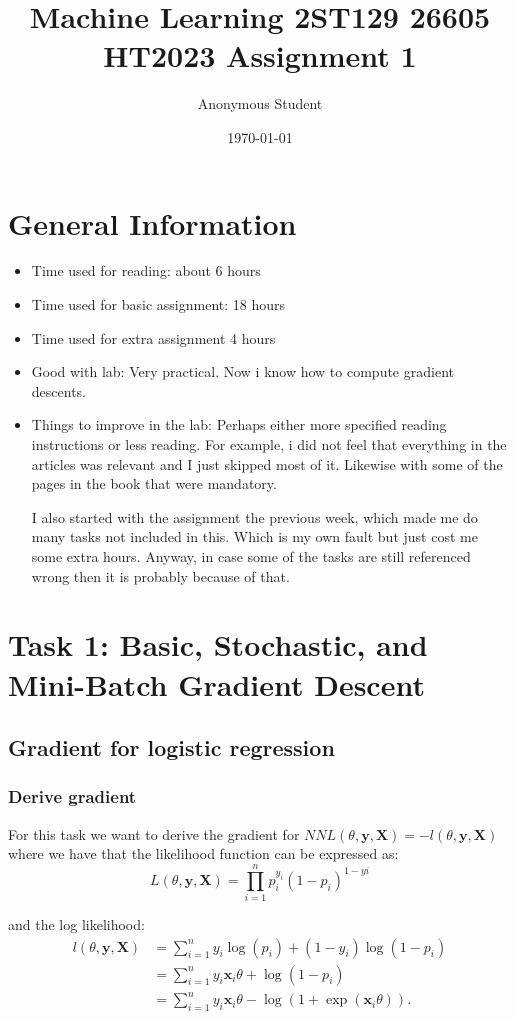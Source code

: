 \documentclass[11pt, a4paper, english]{article}\usepackage[]{graphicx}\usepackage[dvipsnames]{xcolor}
\title{Machine Learning 2ST129 26605 HT2023
 Assignment 1 }
\author{Anonymous Student}
\date{\today}
\begin{document}
\maketitle
\newpage
\tableofcontents
\newpage




\section{General Information}
\begin{itemize}
\item Time used for reading: about 6 hours
\item Time used for basic assignment: 18 hours
\item Time used for extra assignment 4 hours
\item Good with lab: Very practical. Now i know how to compute gradient descents.
\item Things to improve in the lab: Perhaps either more specified reading instructions or less reading. For example, i did not feel that everything in the articles was relevant and I just skipped most of it. Likewise with some of the pages in the book that were mandatory. 

I also started with the assignment the previous week, which made me do many tasks not included in this. Which is my own fault but just cost me some extra hours. Anyway, in case some of the tasks are still referenced wrong then it is probably because of that. 
\end{itemize}
\newpage




\section{Task 1: Basic, Stochastic, and Mini-Batch Gradient Descent}
\subsection{Gradient for logistic regression}
\subsubsection{Derive gradient}
For this task we want to derive the gradient for $NNL(\theta, \bm{y}, \bm{X}) = -l(\theta, \bm{y}, \bm{X})$ 
where we have that the likelihood function can be expressed as:
$$L(\theta, \bm{y}, \bm{X}) = \prod_{i=1}^n p_i^{y_i}(1-p_i)^{1-yi}$$

and the log likelihood:
\begin{align}
l(\theta, \mathbf{y}, \mathbf{X}) & =\sum_{i=1}^n y_i \log \left(p_i\right)+\left(1-y_i\right) \log \left(1-p_i\right) \\
& =\sum_{i=1}^n y_i \mathbf{x}_i \theta+\log \left(1-p_i\right) \\
& =\sum_{i=1}^n y_i \mathbf{x}_i \theta-\log \left(1+\exp \left(\mathbf{x}_i \theta\right)\right) .
\end{align}
\end{document}
